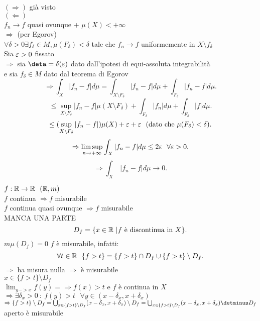 \documentclass[12px]{article}
\begin{document}
	\begin{dimo}
		$ ( \Rightarrow  )$ già visto\\
		$ ( \Leftarrow )$\\
		$f_n \rightarrow f$ quasi ovunque + $\mu(X) < +\infty$\\
		 $ \Rightarrow  $ (per Egorov)\\
		 $\forall \delta > 0 \exists f_\delta\in M, \mu (F_\delta) < \delta$ tale che  $f_n \rightarrow f$ uniformemente in $X\setminus f_\delta$\\
		 Sia  $\varepsilon > 0$ fissato\\
		  $ \Rightarrow  $ sia $\deta = \delta ( \e)$ dato dall'ipotesi di equi-assoluta integrabilità\\
		  e sia  $f_\delta\in M$ dato dal teorema di Egorov
		   \[
			   \Rightarrow  \int_X |f_n - f| d\mu = \int_{X\setminus F_\delta}|f_n - f| d\mu  + \int_{F_\delta}|f_n - f| d\mu 
		  .\] 
		  \[
		  \leq \sup_{X\setminus F_\delta} |f_n-f| \mu (X\setminus F_\delta) + \int_{F_\delta}|f_n|d\mu + \int_{F_\delta}|f|d\mu
		  .\] 
		  \[
			  \leq (\sup_{X\setminus F_\delta}|f_n-f|)\mu(X) + \varepsilon + \varepsilon \ \  (\text{dato che } \mu(F_\delta) < \delta )
		  .\] 
		  \[
			  \Rightarrow \limsup_{n \rightarrow +\infty}\int_X |f_n - f| d\mu \leq 2\varepsilon \ \ \forall \varepsilon > 0 
		  .\] 
		  \[
		  \Rightarrow  \int_X \ |f_n - f | d\mu \rightarrow 0
		  .\] 
	\end{dimo}
	$f: \mathbb{R} \rightarrow \mathbb{R} \ \ (\mathbb{R}, m)$\\
	$f$ continua $ \Rightarrow  f$ misurabile\\
	$f$ continua quasi ovunque $ \Rightarrow  f$ misurabile\\
	MANCA UNA PARTE\\
	\[
		D_f = \{x\in \mathbb{R} \ | f \text{ è discontinua in } X\}\\
	.\] 
	$m\mu(D_f) = 0$  $f$ è misurabile, infatti:
	\[
		\forall t\in \R \ \ \{f > t\} = \{f > t\}\cap D_f\cup \{f > t \} \setminus D_f
	.\] 
	$ \Rightarrow  $ ha misura nulla $ \Rightarrow  $ è misurabile\\
	$x\in \{f > t\} \setminus D_f$\\
	$\lim_{y ->x} f(y) =  \Rightarrow  f(x) > t$ e $f$ è continua in $X$\\ 
	$ \Rightarrow  \exists \delta_x > 0 \ : \ f(y) > t \ \ \ \forall y\in (x - \delta_x, x + \delta_x)$ \\
	$ \Rightarrow \{f > t\}\setminus D_f = \bigcup^{}_{x\in\{f > t\}\setminus D_f}(x-\delta_x, x + \delta_x)\setminus D_f = \bigcup^{}_{x\in\{f>t\}\setminus D_f}(x-\delta_x,x+\delta_x)\detminus D_f$ aperto è misurabile\\
\end{document}
